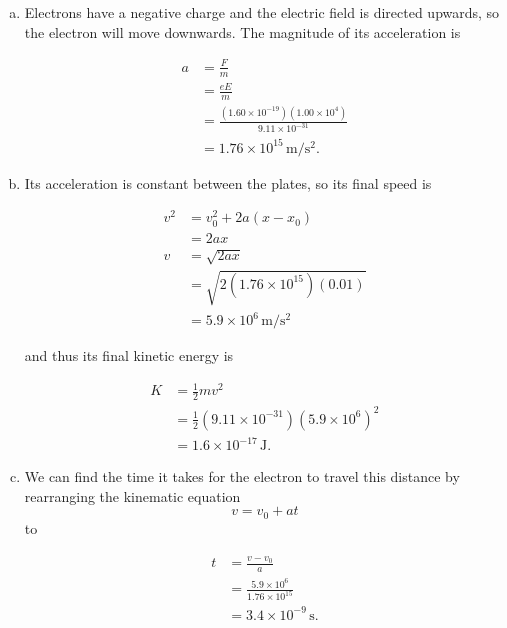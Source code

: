 \documentclass{article}
\begin{document}
\begin{enumerate}[a)]
  \item Electrons have a negative charge and the electric field is directed upwards, so the electron will move downwards. The magnitude of its acceleration is

        \begin{align*}
          a & = \frac{F}{m}                                                           \\
            & = \frac{eE}{m}                                                          \\
            & = \frac{(1.60 \times 10^{-19})(1.00 \times 10^4)}{9.11 \times 10^{-31}} \\
            & = 1.76 \times 10^{15}\,\textrm{m}/\textrm{s}^2.
        \end{align*}

  \item Its acceleration is constant between the plates, so its final speed is

        \begin{align*}
          v^2 & = v_0^2 + 2a(x - x_0)                      \\
              & = 2ax                                      \\
          v   & = \sqrt{2ax}                               \\
              & = \sqrt{2(1.76 \times 10^{15})(0.01)}      \\
              & = 5.9 \times 10^6\,\textrm{m}/\textrm{s}^2
        \end{align*}

        and thus its final kinetic energy is

        \begin{align*}
          K & = \frac{1}{2}mv^2                                      \\
            & = \frac{1}{2}(9.11 \times 10^{-31})(5.9 \times 10^6)^2 \\
            & = 1.6 \times 10^{-17}\,\textrm{J}.
        \end{align*}

  \item We can find the time it takes for the electron to travel this distance by rearranging the kinematic equation \[v = v_0 + at\] to

        \begin{align*}
          t & = \frac{v - v_0}{a}                           \\
            & = \frac{5.9 \times 10^6}{1.76 \times 10^{15}} \\
            & = 3.4 \times 10^{-9}\,\textrm{s}.
        \end{align*}
\end{enumerate}
\end{document}
